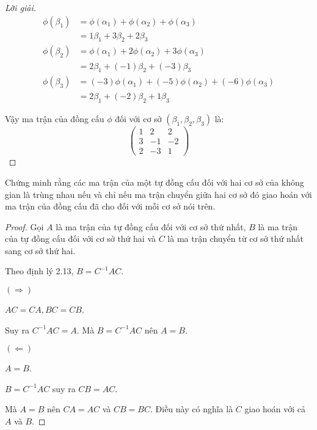 \documentclass[class=linearalgebra,crop=false]{standalone}
\begin{document}
\begin{proof}[Lời giải]
    \begin{align*}
        \phi(\beta_{1}) & = \phi(\alpha_{1}) + \phi(\alpha_{2}) + \phi(\alpha_{3})             \\
                        & = 1\beta_{1} + 3\beta_{2} + 2\beta_{3}                               \\
        \phi(\beta_{2}) & = \phi(\alpha_{1}) + 2\phi(\alpha_{2}) + 3\phi(\alpha_{3})           \\
                        & = 2\beta_{1} + (-1)\beta_{2} + (-3)\beta_{3}                         \\
        \phi(\beta_{3}) & = (-3)\phi(\alpha_{1}) + (-5)\phi(\alpha_{2}) + (-6)\phi(\alpha_{3}) \\
                        & = 2\beta_{1} + (-2)\beta_{2} + 1\beta_{3}
    \end{align*}
    \par Vậy ma trận của đồng cấu $\phi$ đối với cơ sở $(\beta_{1}, \beta_{2}, \beta_{3})$ là:
    \[
        \begin{pmatrix}
            1 & 2  & 2  \\
            3 & -1 & -2 \\
            2 & -3 & 1
        \end{pmatrix}
    \]
\end{proof}

\begin{exercise}
    Chứng minh rằng các ma trận của một tự đồng cấu đối với hai cơ sở của không gian là trùng nhau nếu và chỉ nếu ma trận chuyển giữa hai cơ sở đó giao hoán với ma trận của đồng cấu đã cho đối với mỗi cơ sở nói trên.
\end{exercise}

\begin{proof}
    Gọi $A$ là ma trận của tự đồng cấu đối với cơ sở thứ nhất, $B$ là ma trận của tự đồng cấu đối với cơ sở thứ hai và $C$ là ma trận chuyển từ cơ sở thứ nhất sang cơ sở thứ hai.
    \par Theo định lý 2.13, $B = C^{-1}AC$.
    \par $(\Rightarrow)$
    \par $AC = CA, BC = CB$.
    \par Suy ra $C^{-1}AC = A$. Mà $B = C^{-1}AC$ nên $A = B$.
    \par $(\Leftarrow)$
    \par $A = B$.
    \par $B = C^{-1}AC$ suy ra $CB = AC$.
    \par Mà $A = B$ nên $CA = AC$ và $CB = BC$. Điều này có nghĩa là $C$ giao hoán với cả $A$ và $B$.
\end{proof}
\end{document}

